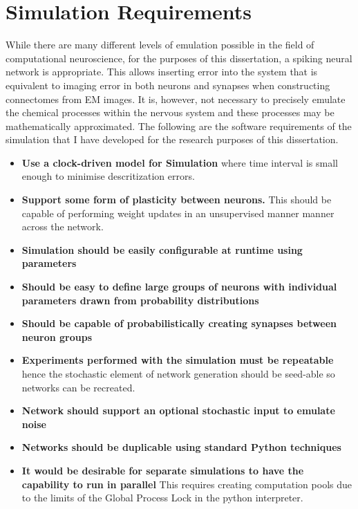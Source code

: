 \section{Simulation Requirements}


While there are many different levels of emulation possible in the field of
computational neuroscience, for the purposes of this dissertation, a spiking
neural network is appropriate. This allows inserting error into the system that
is equivalent to imaging error in both neurons and synapses when constructing
connectomes from EM images. It is, however, not necessary to precisely emulate
the chemical processes within the nervous system and these processes may be
mathematically approximated. The following are the software requirements of the
simulation that I have developed for the research purposes of this dissertation.

\begin{itemize}
    \item \textbf{Use a clock-driven model for Simulation} where time interval
          is small enough to minimise descritization errors.

    \item \textbf{Support some form of plasticity between neurons.} This should
          be capable of performing weight updates in an unsupervised manner manner
          across the network.
    \item \textbf{Simulation should be easily configurable at runtime using parameters}
    \item \textbf{Should be easy to define large groups of neurons with individual parameters drawn from probability distributions}
    \item \textbf{Should be capable of probabilistically creating synapses between neuron groups}
    \item \textbf{Experiments performed with the simulation must be repeatable}
          hence the stochastic element of network generation should be seed-able so
          networks can be recreated.
    \item \textbf{Network should support an optional stochastic input to emulate noise}
    \item \textbf{Networks should be duplicable using standard Python techniques}
    \item \textbf{It would be desirable for separate simulations to have the
              capability to run in parallel} This requires creating computation pools due
          to the limits of the Global Process Lock in the python interpreter.
\end{itemize}